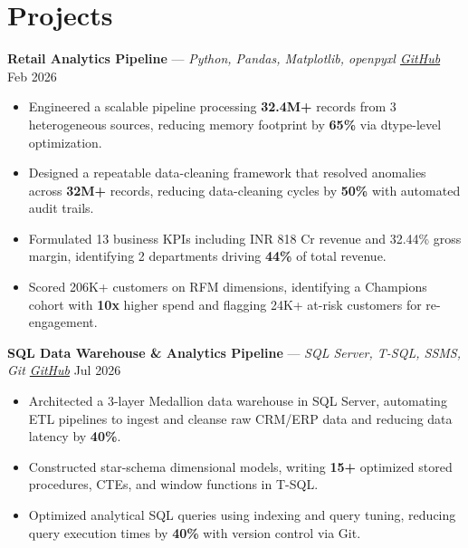 \documentclass[10pt,letterpaper]{article}
\begin{document}
\vspace{3pt}

\section{Projects}

\textbf{Retail Analytics Pipeline} --- \textit{Python, Pandas, Matplotlib, openpyxl \textbar{} \href{https://github.com/razzakshat}{GitHub}} \hfill {\small Feb 2026}
\begin{itemize}
  \item Engineered a scalable pipeline processing \textbf{32.4M+} records from 3 heterogeneous sources, reducing memory footprint by \textbf{65\%} via dtype-level optimization.
  \item Designed a repeatable data-cleaning framework that resolved anomalies across \textbf{32M+} records, reducing data-cleaning cycles by \textbf{50\%} with automated audit trails.
  \item Formulated 13 business KPIs including INR 818 Cr revenue and 32.44\% gross margin, identifying 2 departments driving \textbf{44\%} of total revenue.
  \item Scored 206K+ customers on RFM dimensions, identifying a Champions cohort with \textbf{10x} higher spend and flagging 24K+ at-risk customers for re-engagement.
\end{itemize}

\vspace{2.5pt}

\textbf{SQL Data Warehouse \& Analytics Pipeline} --- \textit{SQL Server, T-SQL, SSMS, Git \textbar{} \href{https://github.com/razzakshat}{GitHub}} \hfill {\small Jul 2026}
\begin{itemize}
  \item Architected a 3-layer Medallion data warehouse in SQL Server, automating ETL pipelines to ingest and cleanse raw CRM/ERP data and reducing data latency by \textbf{40\%}.
  \item Constructed star-schema dimensional models, writing \textbf{15+} optimized stored procedures, CTEs, and window functions in T-SQL.
  \item Optimized analytical SQL queries using indexing and query tuning, reducing query execution times by \textbf{40\%} with version control via Git.
\end{itemize}
\end{document}
